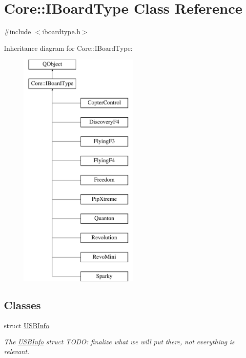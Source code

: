 \hypertarget{class_core_1_1_i_board_type}{\section{Core\-:\-:I\-Board\-Type Class Reference}
\label{class_core_1_1_i_board_type}
}


{\ttfamily \#include $<$iboardtype.\-h$>$}

Inheritance diagram for Core\-:\-:I\-Board\-Type\-:\begin{figure}[H]
\begin{center}
\leavevmode
\includegraphics[height=12.000000cm]{class_core_1_1_i_board_type}
\end{center}
\end{figure}
\subsection*{Classes}
\begin{DoxyCompactItemize}
\item 
struct \hyperlink{struct_core_1_1_i_board_type_1_1_u_s_b_info}{U\-S\-B\-Info}
\begin{DoxyCompactList}\small\item\em The \hyperlink{struct_core_1_1_i_board_type_1_1_u_s_b_info}{U\-S\-B\-Info} struct T\-O\-D\-O\-: finalize what we will put there, not everything is relevant. \end{DoxyCompactList}\end{DoxyCompactItemize}
